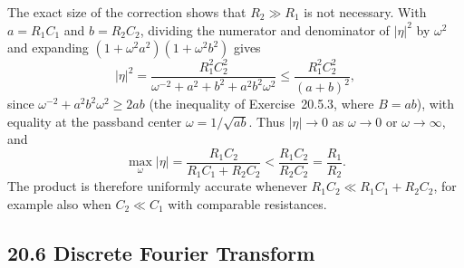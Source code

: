 The exact size of the correction shows that $R_2\gg R_1$ is not
necessary. With $a=R_1C_1$ and
$b=R_2C_2$, dividing the numerator and denominator of $|\eta|^2$
by $\omega^2$ and expanding $(1+\omega^2a^2)(1+\omega^2b^2)$ gives
\[
|\eta|^2=\frac{R_1^2C_2^2}{\omega^{-2}+a^2+b^2+a^2b^2\omega^2}
\le\frac{R_1^2C_2^2}{(a+b)^2},
\]
since $\omega^{-2}+a^2b^2\omega^2\ge2ab$ (the inequality of
Exercise~20.5.3, where $B=ab$), with equality at the passband
center $\omega=1/\sqrt{ab}$. Thus
$|\eta|\to0$ as $\omega\to0$ or $\omega\to\infty$, and
\[
\max_\omega|\eta|=\frac{R_1C_2}{R_1C_1+R_2C_2}
<\frac{R_1C_2}{R_2C_2}=\frac{R_1}{R_2}.
\]
The product is therefore uniformly accurate whenever
$R_1C_2\ll R_1C_1+R_2C_2$, for example also when $C_2\ll C_1$
with comparable resistances.

\subsection*{20.6 Discrete Fourier Transform}

